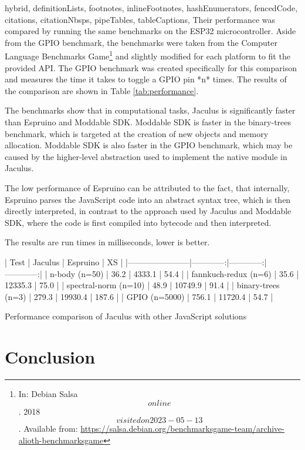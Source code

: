 \begin{markdown*}{%
  hybrid,
  definitionLists,
  footnotes,
  inlineFootnotes,
  hashEnumerators,
  fencedCode,
  citations,
  citationNbsps,
  pipeTables,
  tableCaptions,
}
Their performance was compared by running the same benchmarks on the ESP32 microcontroller. Aside from the GPIO benchmark, the benchmarks were taken from the Computer Language Benchmarks Game\footnote{In: Debian Salsa \[online\]. 2018 \[visited on 2023-05-13\]. Available from: \url{https://salsa.debian.org/benchmarksgame-team/archive-alioth-benchmarksgame}} and slightly modified for each platform to fit the provided API. The GPIO benchmark was created specifically for this comparison and measures the time it takes to toggle a GPIO pin *n* times. The results of the comparison are shown in Table \ref{tab:performance}.

The benchmarks show that in computational tasks, Jaculus is significantly faster than Espruino and Moddable SDK. Moddable SDK is faster in the binary-trees benchmark, which is targeted at the creation of new objects and memory allocation. Moddable SDK is also faster in the GPIO benchmark, which may be caused by the higher-level abstraction used to implement the native module in Jaculus.

The low performance of Espruino can be attributed to the fact, that internally, Espruino parses the JavaScript code into an abstract syntax tree, which is then directly interpreted, in contrast to the approach used by Jaculus and Moddable SDK, where the code is first compiled into bytecode and then interpreted.


\begin{table}[ht]
  \raggedright
  The results are run times in milliseconds, lower is better.

  \centering

  | Test                  | Jaculus     | Espruino    | XS          |
  |-----------------------|------------:|------------:|------------:|
  | n-body (n=50)         | 36.2        | 4333.1      | 54.4        |
  | fannkuch-redux (n=6)  | 35.6        | 12335.3     | 75.0        |
  | spectral-norm (n=10)  | 48.9        | 10749.9     | 91.4        |
  | binary-trees (n=3)    | 279.3       | 19930.4     | 187.6       |
  | GPIO (n=5000)         | 756.1       | 11720.4     | 54.7        |


  \caption{Performance comparison of Jaculus with other JavaScript solutions}

  \label{tab:performance}
\end{table}


\chapter{Conclusion}


\end{markdown*}
